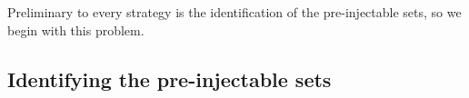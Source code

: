 \documentclass[aps,english,superscriptaddress,onecolumn,twoside,longbibliography,pra,floatfix,fleqn,nofootinbib]{revtex4-1}%
\newcommand*{\tblue}[1]{{\color{MidnightBlue}{\textbf{#1}}}}
\theoremstyle{definition}
\begin{document}

Preliminary to every strategy is the identification of the pre-injectable sets, so we begin with this problem.

\subsection{Identifying the pre-injectable sets}
\label{step:findpreinjectable}
\end{document}
